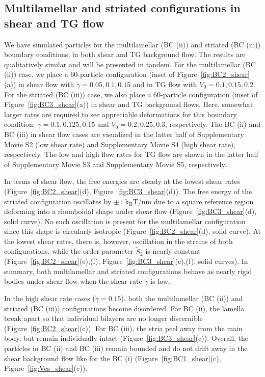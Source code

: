 \documentclass[prb,preprint,showpacs,preprintnumbers,amsmath,amssymb,longbibliography]{revtex4-1}
\begin{document}
\subsection{Multilamellar and striated configurations in shear and TG flow}
We have simulated particles for the multilamellar (BC (ii)) and striated
(BC (iii)) boundary conditions, in both shear and TG background flow.
The results are qualitatively similar and will be presented in tandem.
For the multilamellar (BC (ii)) case, we place a 60-particle configuration (inset
of Figure~\ref{fig:BC2_shear}(a)) in shear flow with $\dot\gamma=0.05,
0.1, 0.15$ and in TG flow with $V_0=0.1, 0.15, 0.2$. For the
striated  (BC (iii)) case, we also place a 60-particle configuration (inset of
Figure~\ref{fig:BC3_shear}(a)) in shear and TG background flows. Here,
somewhat larger rates are required to see appreciable deformations for
this boundary condition: $\dot\gamma=0.1, 0.125, 0.15$ and $V_0=0.2,
0.25, 0.3$, respectively.
The BC (ii) and BC (iii) in shear flow cases are visualized in
the latter half of 
Supplementary Movie S2 (low shear rate) and 
Supplementary Movie S4 (high shear rate), respectively.
The low and high flow rates for TG flow are shown in
the latter half of
Supplementary Movie S3 and 
Supplementary Movie S5, respectively. 


In terms of shear flow, the free energies are steady at the lowest shear
rates (Figure~\ref{fig:BC2_shear}(d), Figure~\ref{fig:BC3_shear}(d)).
The free energy of the striated configuration oscillates by $\pm 1$
$\mathrm{k_BT}$/nm due to a square reference region deforming into a
rhomboidal shape under shear flow (Figure~\ref{fig:BC3_shear}(d), solid
curve). No such oscillation is present for the multilamellar
configuration since this shape is circularly isotropic
(Figure~\ref{fig:BC2_shear}(d), solid curve). At the lowest shear rates,
there is, however, oscillation in the strains of both configurations,
while the order parameter $\tilde S_2$ is nearly constant
(Figure~\ref{fig:BC2_shear}(e),(f), Figure~\ref{fig:BC3_shear}(e),(f),
solid curves). In summary, both multilamellar and striated
configurations behave as nearly rigid bodies under shear flow when the
shear rate $\dot \gamma$ is low.

In the high shear rate cases ($\dot\gamma=0.15$), both the multilamellar (BC (ii))
and striated (BC (iii)) configurations become disordered. For BC (ii), the lamella
break apart so that individual bilayers are no longer discernible
(Figure~\ref{fig:BC2_shear}(c)). For BC (iii), the stria peel away from
the main body, but remain individually intact
(Figure~\ref{fig:BC3_shear}(c)). Overall, the particles in BC (ii) and
BC (iii) remain bounded and do not drift away in the shear background
flow like for the BC (i) (Figure~\ref{fig:BC1_shear}(c),
Figure~\ref{fig:Ves_shear}(c)).
\end{document}
